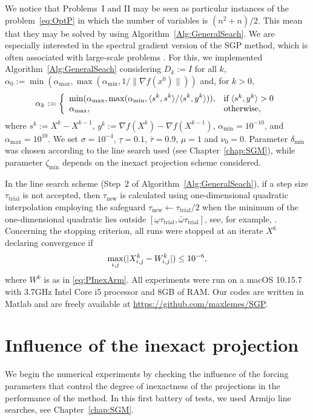 We notice that Problems~I and II may be seen as particular instances of the problem~\eqref{eq:OptP} in which the number of variables is $(n^2+n)/2$. This mean that they may be solved by using Algorithm~\ref{Alg:GeneralSeach}.
We are especially interested in the spectral gradient version \cite{BirginMartinezRaydan2003,spgsiam} of the SGP method, which is often associated with large-scale problems \cite{JSSv060i03}. For this, we implemented Algorithm~\ref{Alg:GeneralSeach} considering $D_k:=I$ for all $k$, $\alpha_0 := \min(\alpha_{\max}, \max(\alpha_{\min}, 1/ \| \nabla f(x^0) \|))$ and, for $k>0$,
\begin{equation*}\label{spg}
	\alpha_k:=\left\{\begin{array}{ll}
		\displaystyle\min (\alpha_{\max},\max (\alpha_{\min},\langle s^k,s^k\rangle/\langle s^k,y^k\rangle)), & \mbox{if} \; \langle s^k,y^k\rangle > 0 \\
		\alpha_{\max},                                                                              & \mbox{otherwise},
	\end{array}\right.
\end{equation*}
where $s^k:=X^k - X^{k-1}$, $y^k:=\nabla f(X^k) - \nabla f(X^{k-1})$, $\alpha_{\min}=10^{-10}$, and $\alpha_{\max}=10^{10}$.
We set $\sigma = 10^{ -4}$, $\underline\tau=0.1$, $\bar\tau=0.9$, $\mu=1$ and $\nu_0=0$. Parameter $\delta_{\min}$ was chosen according to the line search used (see Chapter~\ref{chap:SGM}), while parameter $\zeta_{\min}$ depends on the inexact projection scheme considered.

In the line search scheme (Step~2 of Algorithm~\ref{Alg:GeneralSeach}), if a step size $\tau_{\textrm{trial}}$  is not accepted, then $\tau_{\textrm{new}}$ is calculated using one-dimensional quadratic interpolation employing the safeguard $\tau_{\textrm{new}}\gets \tau_{\textrm{trial}}/2$  when the minimum of the one-dimensional quadratic lies outside $[\underline\omega \tau_{\textrm{trial}}, \bar\omega \tau_{\textrm{trial}} ]$, see, for example,  \cite[Section 3.5]{nocedal2006numerical}.
Concerning the stopping criterion, all runs were stopped at an iterate $X^k$ declaring convergence if
$$\displaystyle \max_{i,j} (|X^k_{i,j}-W^k_{i,j}| )\leq 10^{-6},$$
where $W^k$ is as in \eqref{eq:PInexArm}. All experiments were run on a macOS 10.15.7 with 3.7GHz Intel Core i5 processor and 8GB of RAM. Our codes are written in Matlab and are freely available at  \url{https://github.com/maxlemes/SGP}.
\section{Influence of the inexact projection} \label{sec:forcing}
We begin the numerical experiments by checking the influence of the forcing parameters that control the degree of inexactness of the projections in the performance of the  method. In this first battery of tests, we used Armijo line searches, see Chapter~\ref{chap:SGM}.

